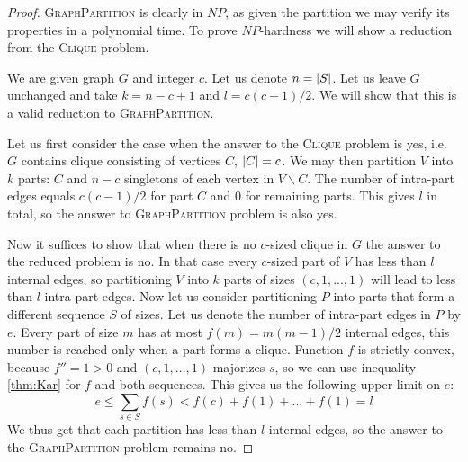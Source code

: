 \begin{proof}
\textsc{GraphPartition} is clearly in $NP$,
as given the partition we may verify its properties in a polynomial time.
To prove $NP$-hardness we will show a reduction from the \textsc{Clique} problem.

We are given graph $G$ and integer $c$.
Let us denote $n = \left\vert S \right\vert$.
Let us leave $G$ unchanged and take $k = n-c+1$ and $l = c(c-1)/2$.
We will show that this is a valid reduction to \textsc{GraphPartition}.

Let us first consider the case when the answer to the \textsc{Clique} problem is yes,
i.e. $G$ contains clique consisting of vertices $C$, $\left\vert C \right\vert = c$.
We may then partition $V$ into $k$ parts: $C$ and $n-c$ singletons of each vertex in $V \backslash C$.
The number of intra-part edges equals $c(c-1)/2$ for part $C$ and $0$ for remaining parts.
This gives $l$ in total, so the answer to \textsc{GraphPartition} problem is also yes.

Now it suffices to show that when there is no $c$-sized clique in $G$
the answer to the reduced problem is no.
In that case every $c$-sized part of $V$ has less than $l$ internal edges,
so partitioning $V$ into $k$ parts of sizes $(c, 1, ..., 1)$ will lead to less than $l$ intra-part edges.
Now let us consider partitioning $P$ into parts that form a different sequence $S$ of sizes.
Let us denote the number of intra-part edges in $P$ by $e$.
Every part of size $m$ has at most $f(m) = m(m-1)/2$ internal edges,
this number is reached only when a part forms a clique.
Function $f$ is strictly convex, because $f'' = 1 > 0$ and $(c,1,...,1)$ majorizes $s$,
so we can use inequality \ref{thm:Kar} for $f$ and both sequences.
This gives us the following upper limit on $e$:
$$e \leq \sum_{s\in{S}} f(s) < f(c) + f(1) + ... + f(1) = l$$
We thus get that each partition has less than $l$ internal edges,
so the answer to the \textsc{GraphPartition} problem remains no.
\end{proof}

